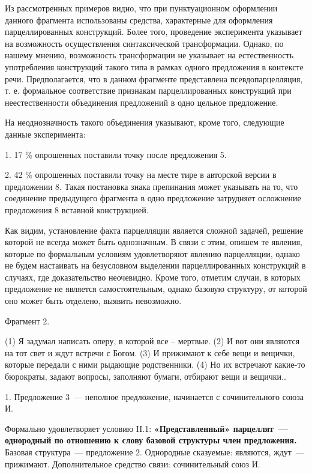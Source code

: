 \documentclass{kursa4}
\begin{document}
{{      {}{Из
      рассмотренных примеров видно, что при пунктуационном оформлении данного
      фрагмента использованы средства, характерные для оформления
      парцеллированных конструкций. Более того, проведение эксперимента
      указывает на возможность осуществления синтаксической трансформации.
      Однако, по нашему мнению, возможность трансформации не указывает на
      естественность употребления конструкций такого типа в рамках одного
      предложения в контексте речи.
      }{Предполагается, что в данном фрагменте
      представлена псевдопарцелляция, т. е. формальное соответствие признакам
      парцеллированных конструкций при неестественности объединения
      предложений в одно цельное предложение. }

      {}{На
      неоднозначность такого объединения указывают, кроме того, следующие
      данные эксперимента:}

      {1. 17 \% опрошенных поставили точку
      после предложения 5.}

      {2. }{42 \%
      опрошенных поставили точку на месте тире в авторской версии в
      предложении 8. Такая постановка знака препинания может указывать на то,
      что соединение предыдущего фрагмента в одно предложение затрудняет
      осложнение предложения 8 вставной конструкцией. }

      {Как видим, установление факта
      парцелляции является сложной задачей, решение которой не всегда может
      быть однозначным. В связи с этим, опишем те явления, которые по
      формальным условиям удовлетворяют явлению парцелляции, однако не будем
      настаивать на безусловном выделении парцеллированных конструкций в
      случаях, где доказательство неочевидно. Кроме того, отметим случаи, в
      которых предложение не
      }{является}{
      самостоятельным, однако базовую структуру, от которой оно может быть
      отделено, выявить невозможно. }

      {Фрагмент 2. }

      {(1) Я задумал написать оперу, в которой
      все – мертвые. (2) И вот они являются на тот свет и ждут встречи с
      Богом. (3) И прижимают к себе вещи и вещички, которые передали с ними
      рыдающие родственники. (4) Но их встречают какие-то бюрократы, задают
      вопросы, заполняют бумаги, отбирают вещи и вещички…}

      {1. Предложение 3~--- неполное
      предложение, начинается с сочинительного союза И.}

      {Формально удовлетворяет условию II.1:
      }\textbf{{«Представленный» парцеллят~---
      однородный по отношению к слову базовой структуры член предложения.
      }}{Базовая структура~--- предложение 2.
      Однородные сказуемые: являются, ждут~--- прижимают. Дополнительное
      средство связи: сочинительный союз И.}

}}
\end{document}
